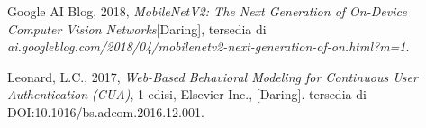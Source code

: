 \documentclass{tesisilkomugm}
\begin{document}
\begin{thebibliography}{99}
Google AI Blog, 2018, \emph{MobileNetV2: The Next Generation of On-Device Computer Vision Networks}[Daring], tersedia di \emph{ai.googleblog.com/2018/04/mobilenetv2-next-generation-of-on.html?m=1}.

Leonard, L.C., 2017, \emph{Web-Based Behavioral Modeling for Continuous User 
	Authentication (CUA)}, 1 edisi, Elsevier Inc., [Daring]. tersedia di 
DOI:10.1016/bs.adcom.2016.12.001.
\end{thebibliography}


\appendix


\end{document}
